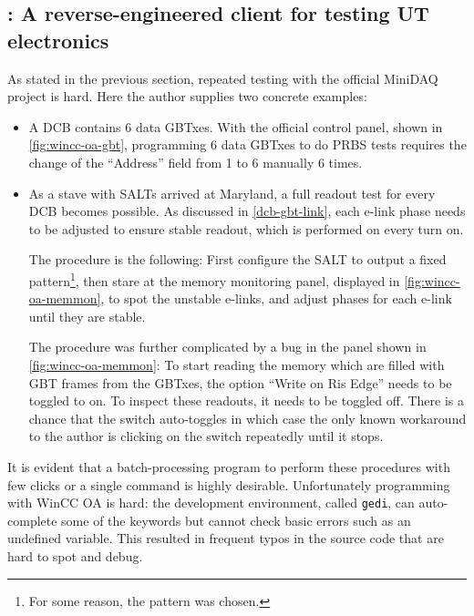 \subsection{\nanoDAQ: A reverse-engineered \dim client for testing UT electronics}
\label{online-nanodaq}

As stated in the previous section, repeated testing with the official MiniDAQ
project is hard.
Here the author supplies two concrete examples:

\begin{itemize}
    \item A DCB contains 6 data GBTxes.
        With the official control panel, shown in \cref{fig:wincc-oa-gbt},
        programming 6 data GBTxes to do PRBS tests requires the change of
        the ``Address'' field from 1 to 6 manually 6 times.

    \item As a stave with SALTs arrived at Maryland,
        a full readout test for every DCB becomes possible.
        As discussed in \cref{dcb-gbt-link},
        each e-link phase needs to be adjusted to ensure stable readout,
        which is performed on every turn on.

        The procedure is the following: First configure the SALT to output a
        fixed pattern\footnote{
            For some reason, the pattern  was chosen.
        }, then stare at the memory monitoring panel,
        displayed in \cref{fig:wincc-oa-memmon},
        to spot the unstable e-links, and adjust phases for each e-link until
        they are stable.

        The procedure was further complicated by a bug in the panel
        shown in \cref{fig:wincc-oa-memmon}:
        To start reading the memory which are filled with GBT frames from the
        GBTxes, the option ``Write on Ris Edge'' needs to be toggled to on. To
        inspect these readouts, it needs to be toggled off. There is a chance
        that the switch auto-toggles in which case the only known workaround to
        the author is clicking on the switch repeatedly until it stops.
\end{itemize}

It is evident that a batch-processing program to perform these procedures with
few clicks or a single command is highly desirable.
Unfortunately programming with WinCC OA is hard:
the development environment, called \lstinline{gedi}, can auto-complete
some of the keywords but cannot check basic errors such as an undefined
variable.
This resulted in frequent typos in the source code that are hard to spot and
debug.

